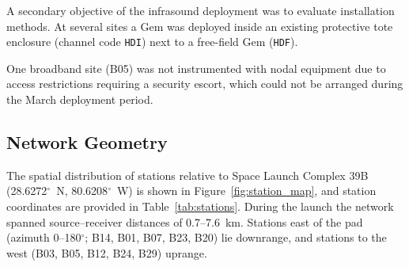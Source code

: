 \documentclass[]{seismica}
\begin{document}
A secondary objective of the infrasound deployment was to evaluate
installation methods. At several sites a Gem was deployed inside an
existing protective tote enclosure (channel code \texttt{HDI}) next to a
free-field Gem (\texttt{HDF}).

One broadband site (B05) was not instrumented with nodal equipment due
to access restrictions requiring a security escort, which could not be
arranged during the March deployment period.

\subsection{Network Geometry}

The spatial distribution of stations relative to Space Launch Complex
39B (28.6272$^{\circ}$~N, 80.6208$^{\circ}$~W) is shown in
Figure~\ref{fig:station_map}, and station coordinates are provided in
Table~\ref{tab:stations}. During the launch the network spanned
source--receiver distances of 0.7--7.6~km. Stations east of the pad
(azimuth 0--180$^{\circ}$; B14, B01, B07, B23, B20) lie downrange, and
stations to the west (B03, B05, B12, B24, B29) uprange.
\end{document}
